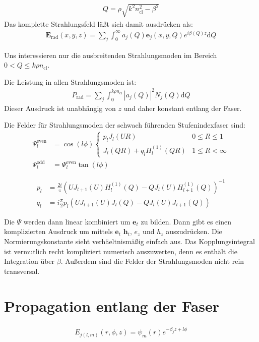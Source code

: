 \documentclass{article}
\newcommand{\vect}[1]{\mathbf{#1}}
\def\e{\vect e}
\def\E{\vect E}
\def\h{\vect h}
\newcommand{\ncl}{n_\textrm{cl}}
\begin{document}
\begin{align}
 Q = \rho \sqrt{k^2\ncl^2-\beta^2}
\end{align}
Das komplette Strahlungsfeld l\"a\ss t sich damit ausdr\"ucken als:
\begin{align}
\E_\textrm{rad} (x,y,z) = \sum_j \int_0^\infty a_j(Q) \e_j(x,y,Q) e^{i\beta(Q)z} \textrm{d} Q
\end{align}

Uns interessieren nur die ausbreitenden Strahlungsmoden im Bereich
$0<Q\le k\rho\ncl$.

Die Leistung in allen Strahlungsmoden ist:
\begin{align}
P_\textrm{rad}  = \sum_j \int_0^{k\rho\ncl}\!\!\!\!\!\!\!\!\! |a_j(Q)|^2 N_j(Q) \textrm{d}Q
\end{align}
Dieser Ausdruck ist unabh\"angig von $z$ und daher konstant entlang
der Faser.

Die Felder f\"ur Strahlungsmoden der schwach f\"uhrenden
Stufenindexfaser sind:
\begin{align}
\Psi_l^\textrm{even} &= \cos(l\phi) \begin{cases}
p_l J_l(UR)  & 0\le R \le 1 \\
J_l(QR)+q_l H_l^{(1)} (QR) & 1 \le R < \infty
\end{cases}\\
\Psi_l^\textrm{odd} &= \Psi_l^\textrm{even} \tan(l\phi)
\end{align}

\begin{align}
p_l &= \frac{2i}{\pi} (U J_{l+1}(U) H_l^{(1)}(Q)-QJ_l(U)H^{(1)}_{l+1}(Q))^{-1} \\
q_l &= i \frac{\pi}{2} p_l(U J_{l+1}(U) J_l(Q)-QJ_l(U)     J_{l+1}(Q))
\end{align}

Die $\Psi$ werden dann linear kombiniert um $\e_t$ zu bilden. Dann
gibt es einen komplizierten Ausdruck um mittels $\e_t$ $\h_t$, $e_z$
und $h_z$ auszudr\"ucken. Die Normierungskonstante sieht
verh\"aeltnism\"a\ss ig einfach aus. Das Kopplungsintegral ist
vermutlich recht kompliziert numerisch auszuwerten, denn es enth\"alt
die Integration \"uber $\beta$. Au\ss erdem sind die Felder der
Strahlungsmoden nicht rein transversal.


\section{Propagation entlang der Faser}
\begin{align}
E_{j(l,m)}(r,\phi,z) = \psi_m(r)e^{-\beta_j z+ l\phi}
\end{align}
\end{document}
